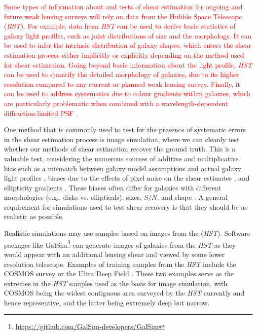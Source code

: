 \documentclass[twocolumn,useAMS,usenatbib]{mn2e}
\newcommand{\rachel}[1]{{\textcolor{red}{#1}}}
\begin{document}
 \rachel{Some types of information about and tests of shear estimation
   for ongoing and future weak lensing surveys will rely on data from
   the Hubble Space Telescope ({\em HST}).  For example, data from
   {\em HST} can be used to derive basic statistics of galaxy light
   profiles, such as joint distributions of size and the morphology.
   It can be used to infer the intrinsic distribution of galaxy
   shapes, which enters the shear estimation process either implicitly
 or explicitly depending on the method used for shear estimation.
 Going beyond basic information about the light profile, {\em HST} can
be used to quantify the detailed morphology of galaxies, due to its
higher resolution compared to any current or planned weak lensing
survey.  Finally, it can be used to address systematics due to colour
gradients within galaxies, which are particularly problematic when
combined with a wavelength-dependent diffraction-limited PSF
\citep[e.g.,][]{2012MNRAS.421.1385V,2013MNRAS.432.2385S}.}

One method that is commonly used to test for the presence of
systematic errors in the shear estimation process is image simulation,
where we can cleanly test whether our methods of shear estimation
recover the ground truth. This is a valuable test, considering the
numerous sources of additive and multiplicative bias such as a
mismatch between galaxy model assumptions and actual galaxy light
profiles \citep[e.g.,][]{2010MNRAS.404..458V, 2010A&A...510A..75M}, biases due to the effects of pixel noise on the
shear estimates
\citep{2012MNRAS.427.2711K,2012MNRAS.424.2757M,2012MNRAS.425.1951R},
and ellipticity gradients \citep{2010MNRAS.406.2793B}.  These biases
often differ for galaxies with different morphologies (e.g., disks
vs. ellipticals), sizes, $S/N$, and shape \citep{2010MNRAS.405.2044B,2012MNRAS.423.3163K}. 
A general requirement for simulations used to test shear recovery is
that they should be as realistic as possible.
 
 Realistic simulations may use samples based on images from the 
 ({\em HST}). Software packages like
{\sc GalSim}\footnote{\url{https://github.com/GalSim-developers/GalSim}}
\citep{2014arXiv1407.7676R} can generate images of galaxies from the
{\em HST} as they would appear with an additional lensing shear and
viewed by some lower resolution telescope.  Examples of training samples from the {\em HST} include 
the COSMOS survey \citep[used by the GREAT3 challenge,][]{great3} or the
 Ultra Deep Field \citep[UDF, used by][]{2013ApJ...765...74J}.  These
 two examples serve as the extremes in the {\em HST} samples used as
 the basis for image simulation, with COSMOS being 
the widest contiguous area surveyed by the {\em HST} currently and hence representive, and the 
latter being extremely deep but narrow.
\end{document}
